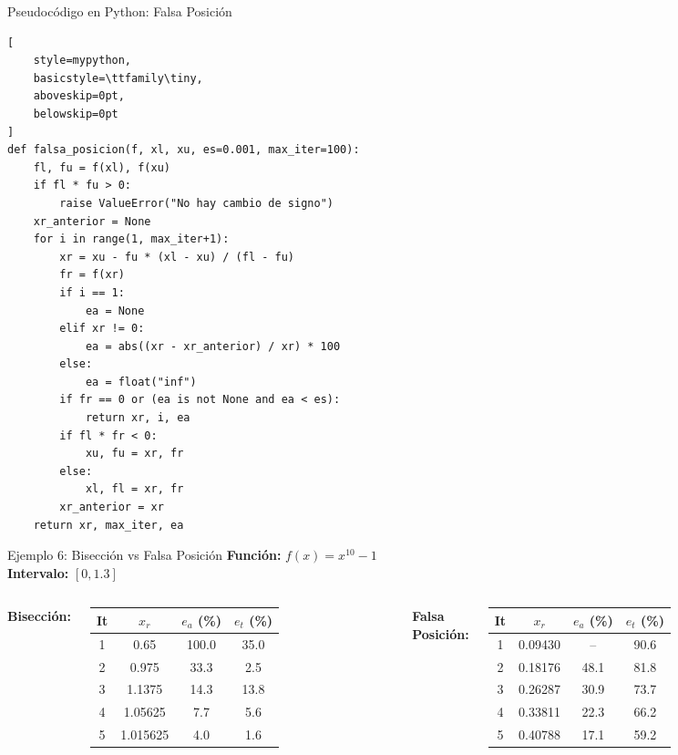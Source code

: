 \documentclass[../../main.tex]{subfiles}
\begin{document}
\begin{frame}[fragile]{Pseudocódigo en Python: Falsa Posición}

\begin{lstlisting}[
    style=mypython,
    basicstyle=\ttfamily\tiny,
    aboveskip=0pt,
    belowskip=0pt
]
def falsa_posicion(f, xl, xu, es=0.001, max_iter=100):
    fl, fu = f(xl), f(xu)
    if fl * fu > 0:
        raise ValueError("No hay cambio de signo")
    xr_anterior = None
    for i in range(1, max_iter+1):
        xr = xu - fu * (xl - xu) / (fl - fu)
        fr = f(xr)
        if i == 1:
            ea = None
        elif xr != 0:
            ea = abs((xr - xr_anterior) / xr) * 100
        else:
            ea = float("inf")
        if fr == 0 or (ea is not None and ea < es):
            return xr, i, ea
        if fl * fr < 0:
            xu, fu = xr, fr
        else:
            xl, fl = xr, fr
        xr_anterior = xr
    return xr, max_iter, ea
\end{lstlisting}

\end{frame}



\begin{frame}{Ejemplo 6: Bisección vs Falsa Posición}
\small
\textbf{Función:} $f(x) = x^{10} - 1$ \\[0.5em]
\textbf{Intervalo:} $[0, 1.3]$

\begin{columns}
  \textbf{Bisección:}
  \begin{tabular}{|c|c|c|c|}
    \hline
    It & $x_r$ & $e_a$ (\%) & $e_t$ (\%) \\
    \hline
    1 & 0.65 & 100.0 & 35.0 \\
    2 & 0.975 & 33.3 & 2.5 \\
    3 & 1.1375 & 14.3 & 13.8 \\
    4 & 1.05625 & 7.7 & 5.6 \\
    5 & 1.015625 & 4.0 & 1.6 \\
    \hline
  \end{tabular}

  \textbf{Falsa Posición:}
  \begin{tabular}{|c|c|c|c|}
    \hline
    It & $x_r$ & $e_a$ (\%) & $e_t$ (\%) \\
    \hline
1 & 0.09430 & -- & 90.6 \\
    2 & 0.18176 & 48.1 & 81.8 \\
    3 & 0.26287 & 30.9 & 73.7 \\
    4 & 0.33811 & 22.3 & 66.2 \\
    5 & 0.40788 & 17.1 & 59.2 \\
    \hline
  \end{tabular}
\end{columns}
\end{frame}
\end{document}
